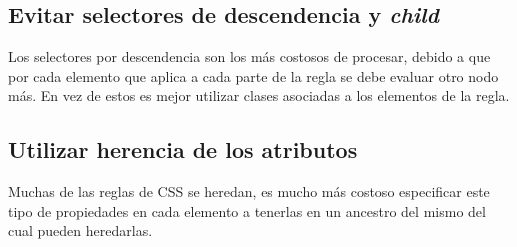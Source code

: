 \subsection{Evitar selectores de descendencia y \emph{child}}
Los selectores por descendencia son los más costosos de procesar, debido a que por cada elemento que aplica a cada parte de la regla se debe evaluar otro nodo más. En
vez de estos es mejor utilizar clases asociadas a los elementos de la regla.

\subsection{Utilizar herencia de los atributos}
Muchas de las reglas de CSS se heredan, es mucho más costoso especificar este tipo de propiedades en cada elemento a tenerlas en un ancestro del mismo del cual
pueden heredarlas.
